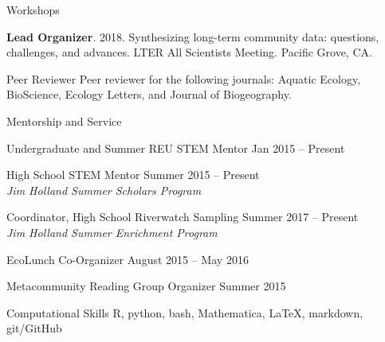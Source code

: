 \documentclass{resume} %
\begin{document}
\begin{rSection}{Workshops}

{\bf Lead Organizer}. 2018. Synthesizing long-term community data: questions, challenges, and advances. LTER All Scientists Meeting. Pacific Grove, CA.

\end{rSection}
\bigskip

\begin{rSection}{Peer Reviewer}
Peer reviewer for the following journals: Aquatic Ecology, BioScience, Ecology Letters, and Journal of Biogeography.
\end{rSection}
\bigskip

\begin{rSection}{Mentorship and Service}

{Undergraduate and Summer REU STEM Mentor} \hfill Jan 2015 -- Present


{High School STEM Mentor} \hfill Summer 2015 -- Present\\
{\em Jim Holland Summer Scholars Program}
 

{Coordinator, High School Riverwatch Sampling} \hfill Summer 2017 -- Present\\
{\em Jim Holland Summer Enrichment Program}

{EcoLunch Co-Organizer} \hfill August 2015 -- May 2016

{Metacommunity Reading Group Organizer} \hfill Summer 2015

\end{rSection}

\bigskip

\begin{rSection}{Computational Skills}
R, python, bash, Mathematica, \LaTeX, markdown, git/GitHub 

\end{rSection}
\end{document}
